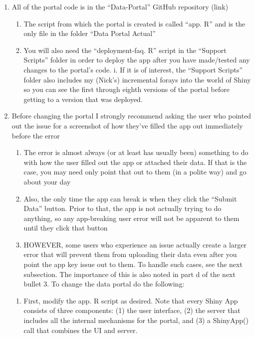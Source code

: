 \documentclass[
  letterpaper,
  DIV=11,
  numbers=noendperiod]{scrreprt}
\providecommand{\tightlist}{%
  \setlength{\itemsep}{0pt}\setlength{\parskip}{0pt}}\usepackage{longtable,booktabs,array}
\begin{document}
\begin{enumerate}
\def\labelenumi{\arabic{enumi}.}
\item
  All of the portal code is in the ``Data-Portal'' GitHub repository
  (link)

  \begin{enumerate}
  \def\labelenumii{\alph{enumii}.}
  \item
    The script from which the portal is created is called ``app. R'' and
    is the only file in the folder ``Data Portal Actual''
  \item
    You will also need the ``deployment-faq. R'' script in the ``Support
    Scripts'' folder in order to deploy the app after you have
    made/tested any changes to the portal's code. i. If it is of
    interest, the ``Support Scripts'' folder also includes my (Nick's)
    incremental forays into the world of Shiny so you can see the first
    through eighth versions of the portal before getting to a version
    that was deployed.
  \end{enumerate}
\item
  Before changing the portal I strongly recommend asking the user who
  pointed out the issue for a screenshot of how they've filled the app
  out immediately before the error

  \begin{enumerate}
  \def\labelenumii{\alph{enumii}.}
  \item
    The error is almost always (or at least has usually been) something
    to do with how the user filled out the app or attached their data.
    If that is the case, you may need only point that out to them (in a
    polite way) and go about your day
  \item
    Also, the only time the app can break is when they click the
    ``Submit Data'' button. Prior to that, the app is not actually
    trying to do anything, so any app-breaking user error will not be
    apparent to them until they click that button
  \item
    HOWEVER, some users who experience an issue actually create a larger
    error that will prevent them from uploading their data even after
    you point the app key issue out to them. To handle such cases, see
    the next subsection. The importance of this is also noted in part d
    of the next bullet 3. To change the data portal do the following:
  \end{enumerate}

  \begin{enumerate}
  \def\labelenumii{\arabic{enumii}.}
  \tightlist
  \item
    First, modify the app. R script as desired. Note that every Shiny
    App consists of three components: (1) the user interface, (2) the
    server that includes all the internal mechanisms for the portal, and
    (3) a ShinyApp() call that combines the UI and server.
  \end{enumerate}


\end{enumerate}
\end{document}
